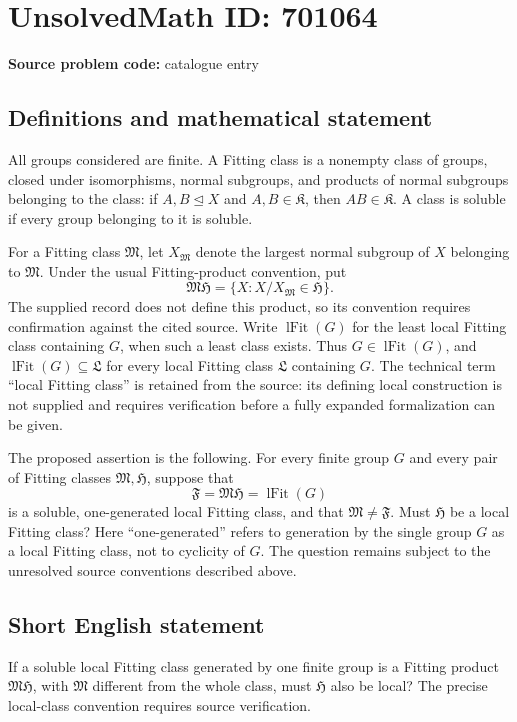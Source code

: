 \documentclass[11pt]{article}
\begin{document}
\section*{UnsolvedMath ID: 701064}
\textbf{Source problem code:} catalogue entry
\subsection{Definitions and mathematical statement}
All groups considered are finite. A Fitting class is a nonempty class of groups, closed under isomorphisms, normal subgroups, and products of normal subgroups belonging to the class: if \(A,B\trianglelefteq X\) and \(A,B\in\mathfrak K\), then \(AB\in\mathfrak K\). A class is soluble if every group belonging to it is soluble.

For a Fitting class \(\mathfrak M\), let \(X_{\mathfrak M}\) denote the largest normal subgroup of \(X\) belonging to \(\mathfrak M\). Under the usual Fitting-product convention, put
\[
\mathfrak M\mathfrak H
=\{X : X/X_{\mathfrak M}\in\mathfrak H\}.
\]
The supplied record does not define this product, so its convention requires confirmation against the cited source. Write \(\operatorname{lFit}(G)\) for the least local Fitting class containing \(G\), when such a least class exists. Thus \(G\in\operatorname{lFit}(G)\), and \(\operatorname{lFit}(G)\subseteq\mathfrak L\) for every local Fitting class \(\mathfrak L\) containing \(G\). The technical term ``local Fitting class'' is retained from the source: its defining local construction is not supplied and requires verification before a fully expanded formalization can be given.

The proposed assertion is the following. For every finite group \(G\) and every pair of Fitting classes \(\mathfrak M,\mathfrak H\), suppose that
\[
\mathfrak F=\mathfrak M\mathfrak H=\operatorname{lFit}(G)
\]
is a soluble, one-generated local Fitting class, and that \(\mathfrak M\ne\mathfrak F\). Must \(\mathfrak H\) be a local Fitting class? Here ``one-generated'' refers to generation by the single group \(G\) as a local Fitting class, not to cyclicity of \(G\). The question remains subject to the unresolved source conventions described above.
\subsection{Short English statement}
If a soluble local Fitting class generated by one finite group is a Fitting product \(\mathfrak M\mathfrak H\), with \(\mathfrak M\) different from the whole class, must \(\mathfrak H\) also be local? The precise local-class convention requires source verification.
\end{document}
